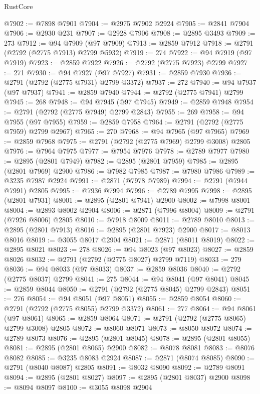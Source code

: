 \begin{lexlean}{RustCore}
\begin{coremodule}
@7902 := @7898 @7901
@7904 := @2975 @7902 @2924
@7905 := @2841 @7904
@7906 := @2930 @231
@7907 := @2928 @7906
@7908 := @2895 @3493
@7909 := 273
@7912 := @94 @7909 (@97 @7909)
@7913 := @2859 @7912
@7918 := @2791 (@2792 (@2775 @7913) @2799 @5932)
@7919 := 274
@7922 := @94 @7919 (@97 @7919)
@7923 := @2859 @7922
@7926 := @2792 (@2775 @7923) @2799
@7927 := 271
@7930 := @94 @7927 (@97 @7927)
@7931 := @2859 @7930
@7936 := @2791 (@2792 (@2775 @7931) @2799 @3372)
@7937 := 272
@7940 := @94 @7937 (@97 @7937)
@7941 := @2859 @7940
@7944 := @2792 (@2775 @7941) @2799
@7945 := 268
@7948 := @94 @7945 (@97 @7945)
@7949 := @2859 @7948
@7954 := @2791 (@2792 (@2775 @7949) @2799 @2843)
@7955 := 269
@7958 := @94 @7955 (@97 @7955)
@7959 := @2859 @7958
@7964 := @2791 (@2792 (@2775 @7959) @2799 @2967)
@7965 := 270
@7968 := @94 @7965 (@97 @7965)
@7969 := @2859 @7968
@7975 := @2791 (@2792 (@2775 @7969) @2799 @3008) @2805
@7976 := @7964 @7975
@7977 := @7954 @7976
@7978 := @2789 @7977
@7980 := @2895 (@2801 @7949)
@7982 := @2895 (@2801 @7959)
@7985 := @2895 (@2801 @7969) @2900
@7986 := @7982 @7985
@7987 := @7980 @7986
@7989 := @3235 @7987 @2924
@7991 := @2871 (@7978 @7989)
@7994 := @2791 (@7944 @7991) @2805
@7995 := @7936 @7994
@7996 := @2789 @7995
@7998 := @2895 (@2801 @7931)
@8001 := @2895 (@2801 @7941) @2900
@8002 := @7998 @8001
@8004 := @2893 @8002 @2904
@8006 := @2871 (@7996 @8004)
@8009 := @2791 (@7926 @8006) @2805
@8010 := @7918 @8009
@8011 := @2789 @8010
@8013 := @2895 (@2801 @7913)
@8016 := @2895 (@2801 @7923) @2900
@8017 := @8013 @8016
@8019 := @3055 @8017 @2904
@8021 := @2871 (@8011 @8019)
@8022 := @2895 @8021
@8023 := 278
@8026 := @94 @8023 (@97 @8023)
@8027 := @2859 @8026
@8032 := @2791 (@2792 (@2775 @8027) @2799 @7119)
@8033 := 279
@8036 := @94 @8033 (@97 @8033)
@8037 := @2859 @8036
@8040 := @2792 (@2775 @8037) @2799
@8041 := 275
@8044 := @94 @8041 (@97 @8041)
@8045 := @2859 @8044
@8050 := @2791 (@2792 (@2775 @8045) @2799 @2843)
@8051 := 276
@8054 := @94 @8051 (@97 @8051)
@8055 := @2859 @8054
@8060 := @2791 (@2792 (@2775 @8055) @2799 @3372)
@8061 := 277
@8064 := @94 @8061 (@97 @8061)
@8065 := @2859 @8064
@8071 := @2791 (@2792 (@2775 @8065) @2799 @3008) @2805
@8072 := @8060 @8071
@8073 := @8050 @8072
@8074 := @2789 @8073
@8076 := @2895 (@2801 @8045)
@8078 := @2895 (@2801 @8055)
@8081 := @2895 (@2801 @8065) @2900
@8082 := @8078 @8081
@8083 := @8076 @8082
@8085 := @3235 @8083 @2924
@8087 := @2871 (@8074 @8085)
@8090 := @2791 (@8040 @8087) @2805
@8091 := @8032 @8090
@8092 := @2789 @8091
@8094 := @2895 (@2801 @8027)
@8097 := @2895 (@2801 @8037) @2900
@8098 := @8094 @8097
@8100 := @3055 @8098 @2904

\end{coremodule}
\end{lexlean}
